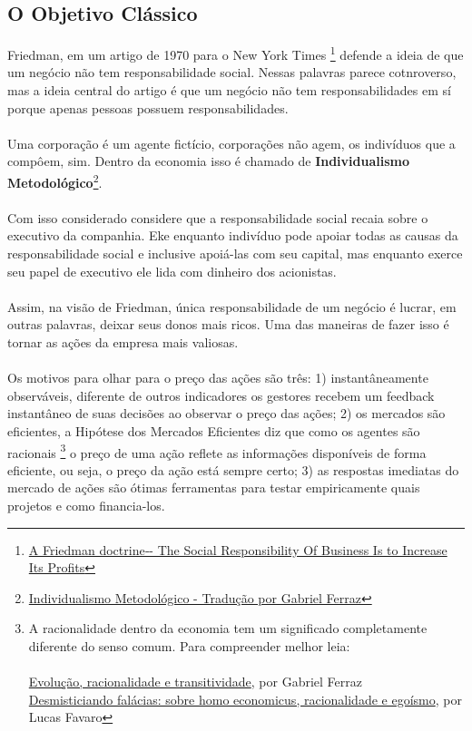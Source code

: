 \subsection*{O Objetivo Clássico}
Friedman, em um artigo de 1970 para o New York Times
\footnote{\href{https://www.nytimes.com/1970/09/13/archives/a-friedman-doctrine-the-social-responsibility-of-business-is-to.html}{A Friedman doctrine‐- The Social Responsibility Of Business Is to Increase Its Profits}}
defende a ideia de que um negócio não tem responsabilidade social. Nessas palavras parece cotnroverso, mas a ideia central do artigo é que um negócio não tem responsabilidades em sí porque apenas pessoas possuem responsabilidades.
\\~\\
Uma corporação é um agente fictício, corporações não agem, os indivíduos que a compôem, sim. Dentro da economia isso é chamado de \textbf{Individualismo Metodológico}\footnote{\href{https://medium.com/@gabrielfferraz/individualismo-metodol\%C3\%B3gico-753f441a6d2c}{Individualismo Metodológico - Tradução por Gabriel Ferraz}}.
\\~\\
Com isso considerado considere que a responsabilidade social recaia sobre o executivo da companhia. Eke enquanto indivíduo pode apoiar todas as causas da responsabilidade social e inclusive apoiá-las com seu capital, mas enquanto exerce seu papel de executivo ele lida com dinheiro dos acionistas.
\\~\\
Assim, na visão de Friedman, única responsabilidade de um negócio é lucrar, em outras palavras, deixar seus donos mais ricos. Uma das maneiras de fazer isso é tornar as ações da empresa mais valiosas.
\\~\\
Os motivos para olhar para o preço das ações são três: 1) instantâneamente observáveis, diferente de outros indicadores os gestores recebem um feedback instantâneo de suas decisões ao observar o preço das ações; 2) os mercados são eficientes, a Hipótese dos Mercados Eficientes diz que como os agentes são racionais \footnote{A racionalidade dentro da economia tem um significado completamente diferente do senso comum. Para compreender melhor leia:
\\~\\
\href{https://economiamainstream.com.br/artigo/evolucao-racionalidade-e-transitividade/}{Evolução, racionalidade e transitividade}, por Gabriel Ferraz\\
\href{https://economiamainstream.com.br/artigo/desmistificando-falacias-sobre-homo-economicus-racionalidade-e-egoismo/}{Desmisticiando falácias: sobre homo economicus, racionalidade e egoísmo}, por Lucas Favaro} o preço de uma ação reflete as informações disponíveis de forma eficiente, ou seja, o preço da ação está sempre certo; 3) as respostas imediatas do mercado de ações são ótimas ferramentas para testar empiricamente quais projetos e como financia-los.
